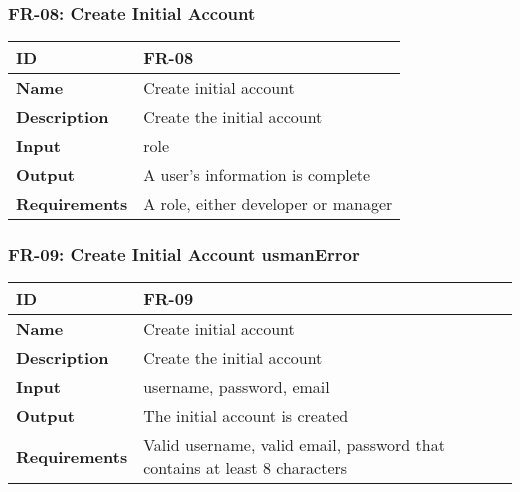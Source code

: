 \subsubsection{FR-08: Create Initial Account}
\begin{center}
  \begin{tabularx}{\textwidth}{|l|X|}
      \hline
      \textbf{ID} & FR-08 \\
      \hline
      \textbf{Name} & Create initial account \\
      \hline
      \textbf{Description} & Create the initial account \\
      \hline
      \textbf{Input} & role \\
      \hline
      \textbf{Output} & A user's information is complete \\
      \hline
      \textbf{Requirements} & A role, either developer or manager \\
      \hline
  \end{tabularx}
\end{center}

\subsubsection{FR-09: Create Initial Account usmanError}
\begin{center}
  \begin{tabularx}{\textwidth}{|l|X|}
      \hline
      \textbf{ID} & FR-09 \\
      \hline
      \textbf{Name} & Create initial account \\
      \hline
      \textbf{Description} & Create the initial account \\
      \hline
      \textbf{Input} & username, password, email \\
      \hline
      \textbf{Output} & The initial account is created \\
      \hline
      \textbf{Requirements} & Valid username, valid email, password that contains at least 8 characters \\
      \hline
  \end{tabularx}
\end{center}

